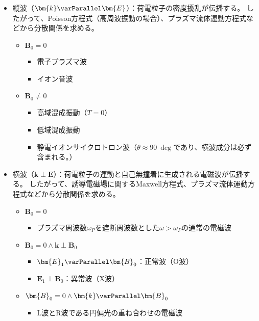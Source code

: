 \begin{itemize}
	\item 縦波（$\bm{k}\varParallel \bm{E}$）：{\color{red}荷電粒子の密度擾乱}が伝播する。
	      したがって、{\color{red}Poisson方程式}（高周波振動の場合）、{\color{red}プラズマ流体運動方程式}などから分散関係を求める。
	      \begin{itemize}
		      \item $\bm{B}_0 = 0$
		            \begin{itemize}
			            \item 電子プラズマ波
			            \item イオン音波
		            \end{itemize}
		      \item $\bm{B}_0 \neq 0$
		            \begin{itemize}
			            \item 高域混成振動（$T=0$）
			            \item 低域混成振動
			            \item 静電イオンサイクロトロン波（$\theta\approx \SI{90}{\deg}$であり、横波成分は必ず含まれる。）
		            \end{itemize}
	      \end{itemize}
	\item 横波（$\bm{k}\perp \bm{E}$）：{\color{red}荷電粒子の運動と自己無撞着に生成される電磁波}が伝播する。
	      したがって、{\color{red}誘導電磁場に関するMaxwell方程式}、{\color{red}プラズマ流体運動方程式}などから分散関係を求める。
	      \begin{itemize}
		      \item $\bm{B}_0 = 0$
		            \begin{itemize}
			            \item プラズマ周波数$\omega_P$を遮断周波数とした$\omega > \omega_P$の通常の電磁波
		            \end{itemize}
		      \item $\bm{B}_0 =0 \wedge \bm{k}\perp \bm{B}_0$
		            \begin{itemize}
			            \item $\bm{E}_1 \varParallel \bm{B}_0$：正常波（O波）
			            \item $\bm{E}_1 \perp \bm{B}_0$：異常波（X波）
		            \end{itemize}
		      \item $\bm{B}_0 =0 \wedge \bm{k}\varParallel \bm{B}_0$
		            \begin{itemize}
			            \item L波とR波である円偏光の重ね合わせの電磁波
		            \end{itemize}
	      \end{itemize}
\end{itemize}


